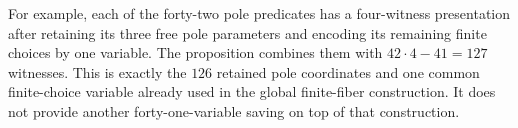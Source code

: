 For example, each of the forty-two pole predicates has a four-witness
presentation after retaining its three free pole parameters and encoding
its remaining finite choices by one variable. The proposition combines
them with $42\cdot4-41=127$ witnesses. This is exactly the $126$
retained pole coordinates and one common finite-choice variable already
used in the global finite-fiber construction. It does not provide another
forty-one-variable saving on top of that construction.
